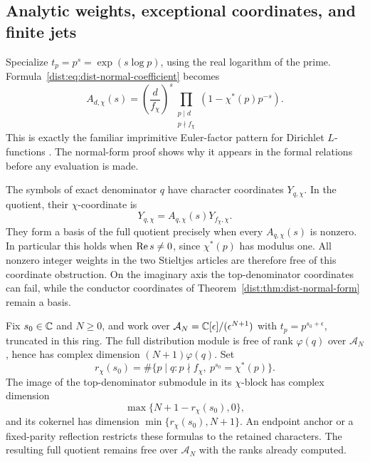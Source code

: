 \subsection{Analytic weights, exceptional coordinates, and finite jets}

Specialize \(t_p=p^s=\exp(s\log p)\), using the real logarithm
of the prime. Formula~\eqref{dist:eq:dist-normal-coefficient} becomes
\begin{equation}
 A_{d,\chi}(s)=
 \left(\frac d{f_\chi}\right)^s
 \prod_{\substack{p\mid d\\p\nmid f_\chi}}
       \left(1-\chi^*(p)p^{-s}\right).
 \label{dist:eq:dist-euler-coefficient}
\end{equation}
This is exactly the familiar imprimitive Euler-factor pattern
for Dirichlet \(L\)-functions \cite{hstruct:DLMF}. The normal-form proof
shows why it appears in the formal relations before any
evaluation is made.

The symbols of exact denominator \(q\) have character coordinates
\(Y_{q,\chi}\). In the quotient, their \(\chi\)-coordinate is
\begin{equation}
 Y_{q,\chi}=A_{q,\chi}(s)Y_{f_\chi,\chi}.
 \label{dist:eq:dist-top-coordinate}
\end{equation}
They form a basis of the full quotient precisely when every
\(A_{q,\chi}(s)\) is nonzero. In particular this holds when
\(\operatorname{Re} s\ne0\), since \(\chi^*(p)\) has modulus one.
All nonzero integer weights in the two Stieltjes articles are
therefore free of this coordinate obstruction. On the imaginary
axis the top-denominator coordinates can fail, while the
conductor coordinates of Theorem~\ref{dist:thm:dist-normal-form}
remain a basis.

\begin{theorem}
\label{dist:thm:dist-jet-defect}
Fix \(s_0\in\mathbb C\) and \(N\geq0\), and work over
\(\mathcal A_N=\mathbb C[\epsilon]/(\epsilon^{N+1})\) with
\(t_p=p^{s_0+\epsilon}\), truncated in this ring.
The full distribution module is free of rank \(\varphi(q)\)
over \(\mathcal A_N\), hence has complex dimension
\((N+1)\varphi(q)\).
Set
\begin{equation}
 r_\chi(s_0)=
 \#\{p\mid q:p\nmid f_\chi,\ p^{s_0}=\chi^*(p)\}.
 \label{dist:eq:dist-resonance-count}
\end{equation}
The image of the top-denominator submodule in its \(\chi\)-block
has complex dimension
\begin{equation}
 \max\{N+1-r_\chi(s_0),0\},
 \label{dist:eq:dist-jet-image}
\end{equation}
and its cokernel has dimension
\(\min\{r_\chi(s_0),N+1\}\).
An endpoint anchor or a fixed-parity reflection restricts these
formulas to the retained characters. The resulting full quotient
remains free over \(\mathcal A_N\) with the ranks already computed.
\end{theorem}

